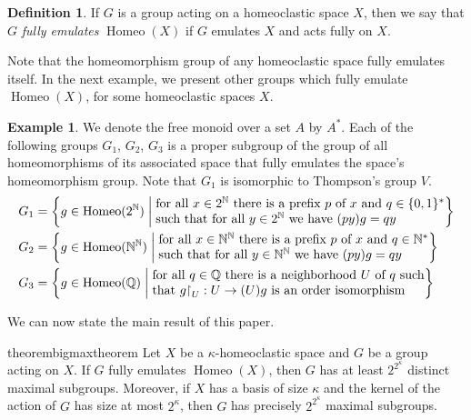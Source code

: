 \documentclass[11pt]{amsart}
\makeatletter
\theoremstyle{definition}
\newtheorem{definition}[theorem]{Definition}
\newtheorem{example}[theorem]{Example}
\newcommand{\Homeo}{\operatorname{Homeo}}
\newcommand{\N}{\mathbb N}
\newcommand{\R}{\mathbb R}
\newcommand{\Q}{\mathbb Q}
\newcommand{\makeset}[2]{\left\lbrace #1 \;\middle|\;
 \begin{tabular}{@{}l@{}}
   #2
  \end{tabular}
  \right\rbrace}
\makeatother
\begin{document}
\begin{definition}\label{full_emulation}
    If \(G\) is a group acting on a homeoclastic space \(X\), then we say that \(G\) \emph{fully emulates} \(\operatorname{Homeo}(X)\) if \(G\) emulates \(X\) and acts fully on \(X\).
\end{definition}
Note that the homeomorphism group of any homeoclastic space fully emulates itself.
In the next example, we present other groups which fully emulate $\Homeo(X)$, for some homeoclastic spaces $X$. 
\begin{example}\label{thompsonish}
 We denote the free monoid over a set $A$ by $A^*$. Each of the following groups $G_1$, $G_2$, $G_3$ is a proper subgroup of the group of all homeomorphisms of its associated space that fully emulates the space's homeomorphism group. Note that $G_1$ is isomorphic to Thompson's group \(V\).
    \begin{align*}
   G_1&=\makeset{g\in \Homeo(2^\N)}{for all \(x\in 2^\N\) there is a prefix \(p\) of \(x\) and \(q\in \{0,1\}^*\) \\
     such that for all \(y\in 2^\N\) we have \((py)g=qy\)}\\
     G_2&=\makeset{g\in \Homeo(\N^\N)}{for all \(x\in \N^\N\) there is a prefix \(p\) of \(x\) and \(q\in \N^*\) \\
     such that for all \(y\in \N^\N\) we have \((py)g=qy\)}\\
     G_3&=\makeset{g\in \Homeo(\Q)}{for all \(q\in \Q\) there is a neighborhood \(U\) of \(q\) such \\that \(g{\restriction}_U:U\to (U)g\) is an order isomorphism}
     \end{align*}
\end{example}
We can now state the main result of this paper. 

\begin{restatable}{theorem}{bigmaxtheorem}
\label{bigmaxtheorem}
    Let $X$ be a \(\kappa\)-homeoclastic space and $G$ be a group acting on \(X\). If $G$ fully emulates  $\operatorname{Homeo}(X)$, then \(G\) has at least $2^{2^{\kappa}}$ distinct maximal subgroups.
    Moreover, if $X$ has a basis of size $\kappa$ and the kernel of the action of \(G\) has size at most $2^\kappa$, then \(G\) has precisely $2^{2^{\kappa}}$  maximal subgroups.
\end{restatable}
\end{document}
